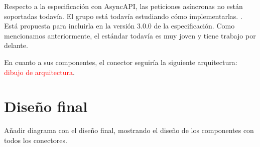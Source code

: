 Respecto a la especificación con AsyncAPI, las peticiones asíncronas no están soportadas todavía. El grupo está todavía estudiando cómo implementarlas. . Está propuesta para incluirla en la versión 3.0.0 de la especificación. Como mencionamos anteriormente, el estándar todavía es muy joven y tiene trabajo por delante.

En cuanto a sus componentes, el conector seguiría la siguiente arquitectura: \textcolor{red}{dibujo de arquitectura}.

\section{Diseño final}

Añadir diagrama con el diseño final, mostrando el diseño de los componentes con todos los conectores.
